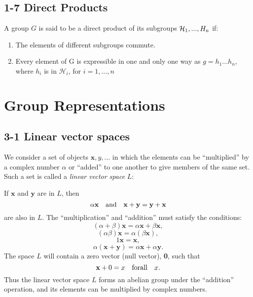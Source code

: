 \documentclass{book}
\begin{document}
\section{1-7 Direct Products}

A group $G$ is said to be a direct product of its subgroups ${\mathcal H_{\rm 1},...,H_{\rm n}}$ if:

\begin{enumerate}
\item The elements of different subgroups commute.
\item Every element of G is expressible in one and only one way as $g = h_1...h_n$, where $h_i$ is in ${\mathcal H}_i$, for $i = 1,...,n$
\end{enumerate}

\chapter{}

\chapter{Group Representations}

\section{3-1 Linear vector spaces}

\def\bx{\mathbf x}
\def\by{\mathbf y}

We consider a set of objects ${\mathbf x,y,...}$ in which the elements can be ``multiplied'' by a complex number $\alpha$ or ``added'' to one another to give members of the same set. Such a set is called a {\it linear vector space} $L$:

If $\bx$ and $\by$ are in $L$, then
$$
\alpha{\mathbf x} \quad {\rm and} \quad {\bx+\by = \by+\bx}
$$
are also in $L$. The ``multiplication'' and ``addition'' must satisfy the conditions:
$$(\alpha + \beta)\bx = \alpha\bx + \beta\bx,$$
$$(\alpha\beta)\bx = \alpha(\beta\bx),$$
$$1\bx = \bx,$$
$$\alpha(\bx+\by) = \alpha\bx + \alpha\by.$$
The space $L$ will contain a zero vector (null vector), {\bf 0}, such that
$$\mathbf x + 0 = x \quad {\rm for all} \quad x.$$
Thus the linear vector space $L$ forms an abelian group under the ``addition'' operation, and its elements can be multiplied by complex numbers.

\section{}
\end{document}
